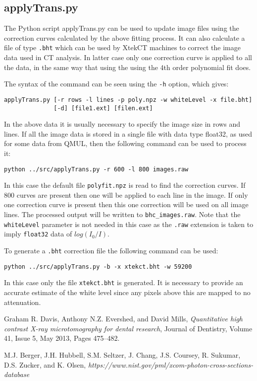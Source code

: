 \documentclass[a4paper,12pt]{article}
\begin{document}
\subsection{applyTrans.py}

The Python script applyTrans.py can be used to update image files using the correction curves calculated by
the above fitting process.
It can also calculate a file of type \texttt{.bht} which can be used by XtekCT machines to correct the image
data used in CT analysis. In latter case only one correction curve is applied to all the data, in the same
way that using the using the 4th order polynomial fit does.

The syntax of the command can be seen using the \texttt{-h} option, which gives:
\begin{verbatim}
applyTrans.py [-r rows -l lines -p poly.npz -w whiteLevel -x file.bht]
              [-d] [file1.ext] [filen.ext]
\end{verbatim}
In the above data it is usually necessary to specify the image size in rows and lines.
If all the image data is stored in a single file with data type float32, as used for
some data from QMUL, then the following command can be used to process it:

\begin{verbatim}
python ../src/applyTrans.py -r 600 -l 800 images.raw
\end{verbatim}
In this case the default file \texttt{polyfit.npz} is read to find the correction curves.
If 800 curves are present then one will be applied to each line in the image.
If only one correction curve is present then this one correction will be used on all image lines.
The processed output will be written to \texttt{bhc\_images.raw}.
Note that the \texttt{whiteLevel} parameter is not needed in this case as the \texttt{.raw} extension
is taken to imply \texttt{float32} data of $log(I_0/I)$.

To generate a \texttt{.bht} correction file the following command can be used:
\begin{verbatim}
python ../src/applyTrans.py -b -x xtekct.bht -w 59200
\end{verbatim}
In this case only the file \texttt{xtekct.bht} is generated. It is necessary to provide an accurate estimate
of the white level since any pixels above this are mapped to no attenuation.

\begin{thebibliography}{9}

  Graham R. Davis, Anthony N.Z. Evershed, and David Mills,
  \emph{Quantitative high contrast X-ray microtomography for dental research},
  Journal of Dentistry,
  Volume 41, Issue 5, May 2013, Pages 475–482.

  M.J. Berger, J.H. Hubbell, S.M. Seltzer, J. Chang, J.S. Coursey, R. Sukumar, D.S. Zucker, and K. Olsen,
  \emph{https://www.nist.gov/pml/xcom-photon-cross-sections-database}

\end{thebibliography}
\end{document}
